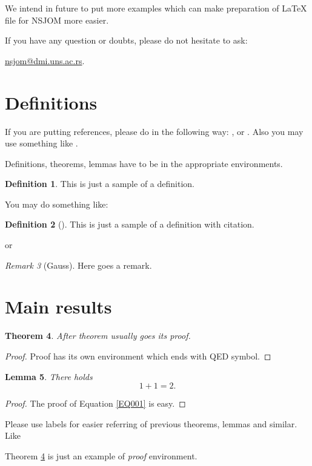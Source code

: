 \documentclass[leqno,twoside]{article}
\numberwithin{equation}{section} %
\newtheorem{thm}{Theorem}[section]
\newtheorem{lem}[thm]{Lemma}
\theoremstyle{definition}
\newtheorem{defn}[thm]{Definition}
\theoremstyle{remark}
\newtheorem{rem}[thm]{Remark}
\begin{document}
We intend in future to put more examples which can make preparation of LaTeX file for NSJOM more easier.


If you have any question or doubts, please do not hesitate to ask:

   \href{mailto:nsjom@dmi.uns.ac.rs}{nsjom@dmi.uns.ac.rs}.


\section{Definitions}

If you are putting references, please do in the following way: \cite{dm2}, or \cite{1,2,3}. Also you may use something like \cite[ch. 3]{3}.

Definitions, theorems, lemmas have to be in the appropriate environments.
\begin{defn}
This is just a sample of a definition.
\end{defn}

You may do something like:
\begin{defn}[\cite{dm2}]
This is just a sample of a definition with citation.
\end{defn}
or
\begin{rem}[Gauss]
Here goes a remark.
\end{rem}


\section{Main results}

\begin{thm}\label{TH001}
After theorem usually goes its proof.
\end{thm}
\begin{proof}
Proof  has its own environment which ends with QED symbol.
\end{proof}


\begin{lem}
There holds
\begin{equation}\label{EQ001}
1+1=2.
\end{equation}
\end{lem}
\begin{proof}
The proof of Equation \eqref{EQ001} is easy.
\end{proof}

Please use labels for easier referring of previous theorems, lemmas and similar. Like

Theorem \ref{TH001} is just an example of \emph{proof} environment.
\end{document}
